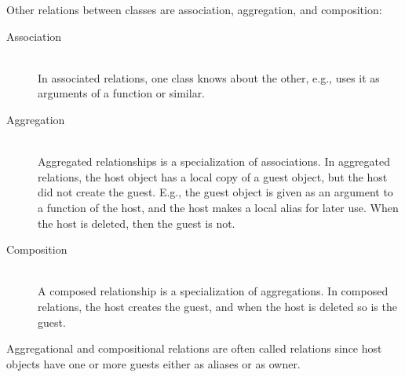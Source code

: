 Other relations between classes are association, aggregation, and composition:
\begin{description}
\item[Association]~\\
In associated relations, one class knows about the other, e.g., uses it as arguments of a function or similar.
\filbreak\item[Aggregation]~\\ 
Aggregated relationships is a specialization of associations. In aggregated relations, the host object has a local copy of a guest object, but the host did not create the guest. E.g., the guest object is given as an argument to a function of the host, and the host makes a local alias for later use. When the host is deleted, then the guest is not.
\filbreak\item[Composition]~\\
A composed relationship is a specialization of aggregations. In composed relations, the host creates the guest, and when the host is deleted so is the guest.
\end{description}
Aggregational and compositional relations are often called  relations since host objects have one or more guests either as aliases or as owner.

